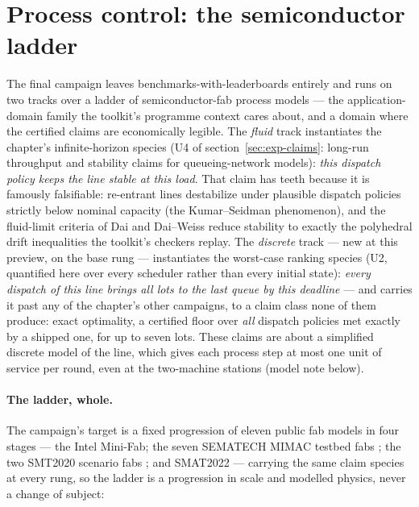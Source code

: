 \section{Process control: the semiconductor ladder}
\label{sec:exp-semicon}

The final campaign leaves benchmarks-with-leaderboards entirely and
runs on two tracks over a ladder of semiconductor-fab process models
--- the application-domain family the toolkit's programme context
cares about, and a domain where the certified claims are economically
legible. The \emph{fluid} track instantiates the chapter's
infinite-horizon species (U4 of section~\ref{sec:exp-claims}:
long-run throughput and stability claims for queueing-network
models): \emph{this dispatch policy keeps the line stable at this
load}. That claim has teeth because it is famously falsifiable:
re-entrant lines destabilize under plausible dispatch policies
strictly below nominal capacity (the Kumar--Seidman phenomenon), and
the fluid-limit criteria of Dai and Dai--Weiss reduce stability to
exactly the polyhedral drift inequalities the toolkit's checkers
replay. The \emph{discrete} track --- new at this preview, on the
base rung --- instantiates the worst-case ranking species (U2,
quantified here over every scheduler rather than every initial
state): \emph{every dispatch of this line brings all lots to the last
queue by this deadline} --- and carries it past any of the chapter's other
campaigns, to a claim class none of them produce: exact optimality,
a certified floor over \emph{all} dispatch policies met exactly by a
shipped one, for up to seven lots. These claims are about a
simplified discrete model of the line, which gives each process step
at most one unit of service per round, even at the two-machine
stations (model note below).

\paragraph{The ladder, whole.} The campaign's target is a fixed
progression of eleven public fab models in four stages --- the Intel
Mini-Fab; the seven SEMATECH MIMAC testbed fabs
; the two SMT2020
scenario fabs ; and SMAT2022  --- carrying the same claim species at every rung, so the
ladder is a progression in scale and modelled physics, never a change
of subject:

